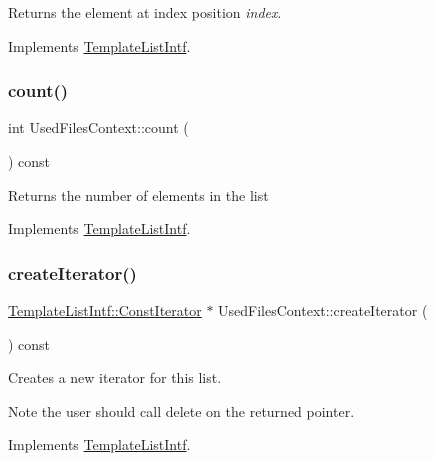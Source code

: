 Returns the element at index position {\itshape index}. 

Implements \mbox{\hyperlink{class_template_list_intf_aa51e57e72eacf4e8ce1055ee30a0f7f8}{Template\+List\+Intf}}.

\mbox{\label{class_used_files_context_a36827fc21901f94c4daaffb3fcfd9520}} 
\subsubsection{\texorpdfstring{count()}{count()}}
{\footnotesize\ttfamily int Used\+Files\+Context\+::count (\begin{DoxyParamCaption}{ }\end{DoxyParamCaption}) const\hspace{0.3cm}{\ttfamily [virtual]}}

Returns the number of elements in the list 

Implements \mbox{\hyperlink{class_template_list_intf_a329e49e33484c2aa5106aac1bf4e5216}{Template\+List\+Intf}}.

\mbox{\label{class_used_files_context_ae9f5d2b5f060ddf612f17054499b8bda}} 
\subsubsection{\texorpdfstring{createIterator()}{createIterator()}}
{\footnotesize\ttfamily \mbox{\hyperlink{class_template_list_intf_1_1_const_iterator}{Template\+List\+Intf\+::\+Const\+Iterator}} $\ast$ Used\+Files\+Context\+::create\+Iterator (\begin{DoxyParamCaption}{ }\end{DoxyParamCaption}) const\hspace{0.3cm}{\ttfamily [virtual]}}

Creates a new iterator for this list. \begin{DoxyNote}{Note}
the user should call delete on the returned pointer. 
\end{DoxyNote}


Implements \mbox{\hyperlink{class_template_list_intf_a56b82384db24c3e121076a1da046d378}{Template\+List\+Intf}}.

